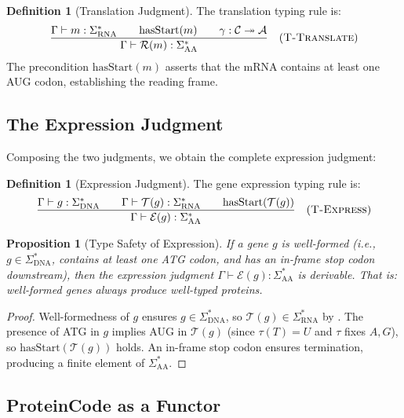 \documentclass[12pt,a4paper]{article}
\newtheorem{proposition}[theorem]{Proposition}
\theoremstyle{definition}
\newtheorem{definition}[theorem]{Definition}
\begin{document}
\begin{definition}[Translation Judgment]\label{def:translation-judgment}
The translation typing rule is:
\[
  \frac{\Gamma \vdash m : \Sigma_\mathrm{RNA}^* \qquad \mathrm{hasStart}(m) \qquad \gamma : \mathcal{C} \twoheadrightarrow \mathcal{A}}
       {\Gamma \vdash \mathcal{R}(m) : \Sigma_\mathrm{AA}^*}
  \quad (\textsc{T-Translate})
\]
The precondition $\mathrm{hasStart}(m)$ asserts that the mRNA contains at least one AUG codon, establishing the reading frame.
\end{definition}

\subsection{The Expression Judgment}

Composing the two judgments, we obtain the complete expression judgment:

\begin{definition}[Expression Judgment]\label{def:expression-judgment}
The gene expression typing rule is:
\[
  \frac{
    \Gamma \vdash g : \Sigma_\mathrm{DNA}^* \qquad
    \Gamma \vdash \mathcal{T}(g) : \Sigma_\mathrm{RNA}^* \qquad
    \mathrm{hasStart}(\mathcal{T}(g))
  }{
    \Gamma \vdash \mathcal{E}(g) : \Sigma_\mathrm{AA}^*
  }
  \quad (\textsc{T-Express})
\]
\end{definition}

\begin{proposition}[Type Safety of Expression]\label{prop:type-safety}
If a gene $g$ is well-formed (i.e., $g \in \Sigma_\mathrm{DNA}^*$, contains at least one ATG codon, and has an in-frame stop codon downstream), then the expression judgment $\Gamma \vdash \mathcal{E}(g) : \Sigma_\mathrm{AA}^*$ is derivable. That is: well-formed genes always produce well-typed proteins.
\end{proposition}

\begin{proof}
Well-formedness of $g$ ensures $g \in \Sigma_\mathrm{DNA}^*$, so $\mathcal{T}(g) \in \Sigma_\mathrm{RNA}^*$ by . The presence of ATG in $g$ implies AUG in $\mathcal{T}(g)$ (since $\tau(T)=U$ and $\tau$ fixes $A,G$), so $\mathrm{hasStart}(\mathcal{T}(g))$ holds. An in-frame stop codon ensures termination, producing a finite element of $\Sigma_\mathrm{AA}^*$.
\end{proof}

\subsection{ProteinCode as a Functor}
\end{document}
